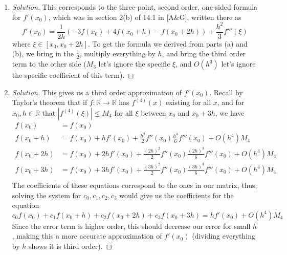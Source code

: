\documentclass{article}
\newcommand{\R}{{\mathbb R}}
\begin{document}
\begin{enumerate}
\begin{proof}[Solution]
		(i.e. the coefficients of $f$, $hf'$, and
		$\frac{h^2}{2}f''$ are the entries of $A$).
		Hence, our coefficients are the solution to part (a),
		namely, $c_0 = -3/2$, $c_1 = 4/2$, $c_2 = -1/2$.
		This gives us
		\[
			-\frac32f(x_0) + \frac{4}{2}f(x_0+h) - \frac{1}{2}f(x_0+2h)
			= hf'(x_0) + O(h^3)M_3
		\]
	\end{proof}
	\item \begin{proof}[Solution]\let\qed\relax
		This corresponds to the three-point, second order, one-sided formula for $f'(x_0)$,
		which was in section 2(b) of 14.1 in [A\&G], written there as
		\[
			f'(x_0) = \frac{1}{2h}\left(-3f(x_0)+4f(x_0+h)-f(x_0+2h)\right)
				+ \frac{h^2}{3}f'''(\xi)
		\]
		where $\xi \in [x_0, x_0 + 2h]$.
		To get the formula we derived from parts (a) and (b),
		we bring in the $\frac12$, multiply everything by $h$,
		and bring the third order term to the other side
		($M_3$ let's ignore the specific $\xi$,
		and $O(h^3)$ let's ignore the specific coefficient of this term).
	\end{proof}
	\item \begin{proof}[Solution]\let\qed\relax
		This gives us a third order approximation of $f'(x_0)$.
		Recall by Taylor's theorem that if $f \colon \R \to \R$ has
		$f^{(4)}(x)$ existing for all $x$,
		and for $x_0,h \in \R$ that $|f^{(4)}(\xi)|\leq M_4$ for all $\xi$
		between $x_0$ and $x_0 + 3h$, we have
		\begin{align*}
			f(x_0) &= f(x_0)\\
			f(x_0 + h) &= f(x_0) + hf'(x_0) + \frac{h^2}{2}f''(x_0)
			\frac{h^3}{6}f'''(x_0) + O(h^4)M_4\\
			f(x_0 + 2h) &= f(x_0) + 2hf'(x_0) + \frac{(2h)^2}{2}f''(x_0)
			\frac{(2h)^3}{6}f'''(x_0) + O(h^4)M_4\\
			f(x_0 + 3h) &= f(x_0) + 3hf'(x_0) + \frac{(3h)^2}{2}f''(x_0)
			\frac{(3h)^3}{6}f'''(x_0) + O(h^4)M_4\\
		\end{align*}
		The coefficients of these equations correspond to the ones in our matrix,
		thus, solving the system for $c_0,c_1,c_2,c_3$ would give us the
		coefficients for the equation
		\[
			c_0f(x_0) + c_1f(x_0 + h) + c_2f(x_0 + 2h) + c_3f(x_0 + 3h)
			= hf'(x_0) + O(h^4)M_4
		\]
		Since the error term is higher order,
		this should decrease our error for small $h$,
		making this a more accurate approximation of $f'(x_0)$
		(dividing everything by $h$ shows it is third order).
	\end{proof}
\end{enumerate}
\end{document}
